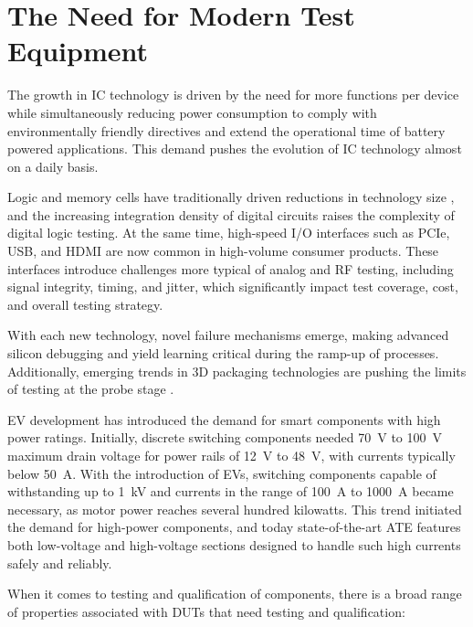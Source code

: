 

\section{The Need for Modern Test Equipment}
\label{sec:need-modern-test-equipment}

The growth in \ac{IC} technology is driven by the need for more
functions per device while simultaneously reducing power consumption to comply
with environmentally friendly directives and extend the operational time of battery
powered applications.
This demand pushes the evolution of \ac{IC} technology almost on a daily basis.

Logic and memory cells have traditionally driven reductions in technology size \autocite{8776580}, 
and the increasing integration density of digital circuits raises the complexity of digital logic 
testing. At the same time, high-speed \ac{I/O} interfaces such as \ac{PCIe}, \ac{USB}, and \ac{HDMI} 
are now common in high-volume consumer products. These interfaces introduce challenges more typical 
of analog and RF testing, including signal integrity, timing, and jitter, which significantly impact 
test coverage, cost, and overall testing strategy.

With each new technology, novel failure mechanisms emerge, making advanced
silicon debugging and yield learning critical during the ramp-up of
processes.
Additionally, emerging trends in 3D packaging technologies are pushing the
limits of testing at the probe stage \autocite{8480435}.

\ac{EV} development has introduced the demand for smart components with high power ratings. 
Initially, discrete switching components needed \SI{70}{\volt} to \SI{100}{\volt} maximum drain 
voltage for power rails of \SI{12}{\volt} to \SI{48}{\volt}, with currents typically below 
\SI{50}{\ampere}. With the introduction of \ac{EV}s, switching components capable of withstanding 
up to \SI{1}{\kilo\volt} and currents in the range of \SI{100}{\ampere} to \SI{1000}{\ampere} 
became necessary, as motor power reaches several hundred kilowatts. This trend initiated the demand 
for high-power components, and today state-of-the-art \ac{ATE} features both low-voltage and 
high-voltage sections designed to handle such high currents safely and reliably.

When it comes to testing and qualification of components, there is a broad
range of properties associated with \ac{DUT}s that need testing and
qualification:

